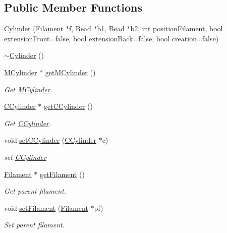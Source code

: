 \subsection*{Public Member Functions}
\begin{DoxyCompactItemize}
\item 
\hyperlink{classCylinder_ac77d1ec51d1e6ea5e04ba57167b74f7c}{Cylinder} (\hyperlink{classFilament}{Filament} $\ast$f, \hyperlink{classBead}{Bead} $\ast$b1, \hyperlink{classBead}{Bead} $\ast$b2, int position\+Filament, bool extension\+Front=false, bool extension\+Back=false, bool creation=false)
\item 
\hyperlink{classCylinder_a05ab556f0ae3cd6e99d9d1f3caca80b3}{$\sim$\+Cylinder} ()
\item 
\hyperlink{classMCylinder}{M\+Cylinder} $\ast$ \hyperlink{classCylinder_afd6f95caf16bcae5b6c736f714cca48a}{get\+M\+Cylinder} ()
\begin{DoxyCompactList}\small\item\em Get \hyperlink{classMCylinder}{M\+Cylinder}. \end{DoxyCompactList}\item 
\hyperlink{classCCylinder}{C\+Cylinder} $\ast$ \hyperlink{classCylinder_a81073a91dfc65b06626d2cfe44d23d6c}{get\+C\+Cylinder} ()
\begin{DoxyCompactList}\small\item\em Get \hyperlink{classCCylinder}{C\+Cylinder}. \end{DoxyCompactList}\item 
void \hyperlink{classCylinder_aa30a252b7b6f32bb7e3bb8c3b1ca30b4}{set\+C\+Cylinder} (\hyperlink{classCCylinder}{C\+Cylinder} $\ast$c)
\begin{DoxyCompactList}\small\item\em set \hyperlink{classCCylinder}{C\+Cylinder} \end{DoxyCompactList}\item 
\hyperlink{classFilament}{Filament} $\ast$ \hyperlink{classCylinder_ac4311ad2d6750d666ef8522a14250062}{get\+Filament} ()
\begin{DoxyCompactList}\small\item\em Get parent filament. \end{DoxyCompactList}\item 
void \hyperlink{classCylinder_aa5908e1527e6349cd286792daafa9135}{set\+Filament} (\hyperlink{classFilament}{Filament} $\ast$pf)
\begin{DoxyCompactList}\small\item\em Set parent filament. \end{DoxyCompactList}\item 

\end{DoxyCompactItemize}
